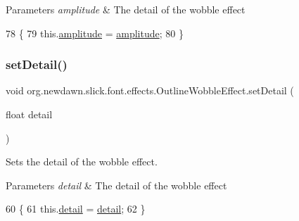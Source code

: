 \begin{DoxyParams}{Parameters}
{\em amplitude} & The detail of the wobble effect \\
\hline
\end{DoxyParams}

\begin{DoxyCode}
78                                               \{
79         this.\mbox{\hyperlink{classorg_1_1newdawn_1_1slick_1_1font_1_1effects_1_1_outline_wobble_effect_a6797d66a3cfb14ca9b2e04bad9f2979e}{amplitude}} = \mbox{\hyperlink{classorg_1_1newdawn_1_1slick_1_1font_1_1effects_1_1_outline_wobble_effect_a6797d66a3cfb14ca9b2e04bad9f2979e}{amplitude}};
80     \}
\end{DoxyCode}
\mbox{\label{classorg_1_1newdawn_1_1slick_1_1font_1_1effects_1_1_outline_wobble_effect_a25159426b48e722a4a5588241941afa3}} 
\subsubsection{\texorpdfstring{set\+Detail()}{setDetail()}}
{\footnotesize\ttfamily void org.\+newdawn.\+slick.\+font.\+effects.\+Outline\+Wobble\+Effect.\+set\+Detail (\begin{DoxyParamCaption}\item[{float}]{detail }\end{DoxyParamCaption})\hspace{0.3cm}{\ttfamily [inline]}}

Sets the detail of the wobble effect.


\begin{DoxyParams}{Parameters}
{\em detail} & The detail of the wobble effect \\
\hline
\end{DoxyParams}

\begin{DoxyCode}
60                                         \{
61         this.\mbox{\hyperlink{classorg_1_1newdawn_1_1slick_1_1font_1_1effects_1_1_outline_wobble_effect_ac43d2a2c878ac5034bf82a0837cfa86f}{detail}} = \mbox{\hyperlink{classorg_1_1newdawn_1_1slick_1_1font_1_1effects_1_1_outline_wobble_effect_ac43d2a2c878ac5034bf82a0837cfa86f}{detail}};
62     \}
\end{DoxyCode}
\mbox{\label{classorg_1_1newdawn_1_1slick_1_1font_1_1effects_1_1_outline_wobble_effect_a7b65a07d67b435d9a5fb18647b6622dd}} 
